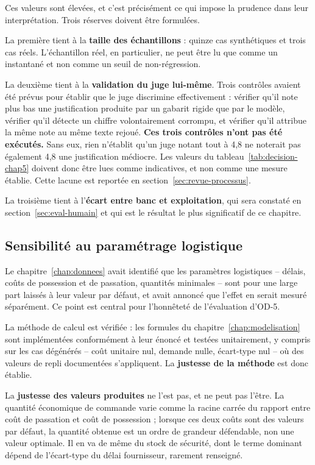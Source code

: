 Ces valeurs sont élevées, et c'est précisément ce qui impose la prudence dans leur interprétation. Trois réserves doivent être formulées.

La première tient à la \textbf{taille des échantillons} : quinze cas synthétiques et trois cas réels. L'échantillon réel, en particulier, ne peut être lu que comme un instantané et non comme un seuil de non-régression.

La deuxième tient à la \textbf{validation du juge lui-même}. Trois contrôles avaient été prévus pour établir que le juge discrimine effectivement : vérifier qu'il note plus bas une justification produite par un gabarit rigide que par le modèle, vérifier qu'il détecte un chiffre volontairement corrompu, et vérifier qu'il attribue la même note au même texte rejoué. \textbf{Ces trois contrôles n'ont pas été exécutés.} Sans eux, rien n'établit qu'un juge notant tout à 4,8 ne noterait pas également 4,8 une justification médiocre. Les valeurs du tableau~\ref{tab:decision-chap5} doivent donc être lues comme indicatives, et non comme une mesure établie. Cette lacune est reportée en section~\ref{sec:revue-processus}.

La troisième tient à l'\textbf{écart entre banc et exploitation}, qui sera constaté en section~\ref{sec:eval-humain} et qui est le résultat le plus significatif de ce chapitre.

\subsection{Sensibilité au paramétrage logistique}

Le chapitre~\ref{chap:donnees} avait identifié que les paramètres logistiques -- délais, coûts de possession et de passation, quantités minimales -- sont pour une large part laissés à leur valeur par défaut, et avait annoncé que l'effet en serait mesuré séparément. Ce point est central pour l'honnêteté de l'évaluation d'OD-5.

La méthode de calcul est vérifiée : les formules du chapitre~\ref{chap:modelisation} sont implémentées conformément à leur énoncé et testées unitairement, y compris sur les cas dégénérés -- coût unitaire nul, demande nulle, écart-type nul -- où des valeurs de repli documentées s'appliquent. La \textbf{justesse de la méthode} est donc établie.

La \textbf{justesse des valeurs produites} ne l'est pas, et ne peut pas l'être. La quantité économique de commande varie comme la racine carrée du rapport entre coût de passation et coût de possession ; lorsque ces deux coûts sont des valeurs par défaut, la quantité obtenue est un ordre de grandeur défendable, non une valeur optimale. Il en va de même du stock de sécurité, dont le terme dominant dépend de l'écart-type du délai fournisseur, rarement renseigné.

